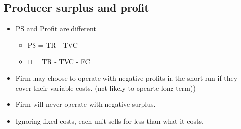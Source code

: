 \documentclass{article}
\begin{document}
\subsection{Producer surplus and profit}
\begin{itemize}
  \item PS and Profit are different
    \begin{itemize}
      \item PS = TR - TVC
      \item $\sqcap$ = TR - TVC - FC
    \end{itemize}
  \item Firm may choose to operate with negative profits in the short run if they cover their variable costs.
    (not likely to opearte long term))
  \item Firm will never operate with negative surplus.
  \item Ignoring fixed costs, each unit sells for less than what it costs.
\end{itemize}
\end{document}
